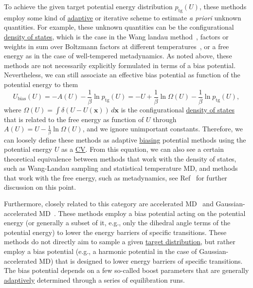 \documentclass[9pt,review]{livecoms}
\newcommand{\vx}{\mathbf{x}}
\begin{document}
To achieve the given target potential energy distribution $p_{\mathrm{tg}}(U)$, these methods employ some kind of \hyperlink{ref:Adaptive} {adaptive} or iterative scheme to estimate \textit{a priori} unknown quantities. For example, these unknown quantities can be the configurational \hyperlink{ref:density_of_states}{density of states}, which is the case in the Wang landau method~\cite{wang-landau:prl:2001:wang-landau,Kim2006_PRL_STMD,DePablo_DOS_2012}, factors or weights in sum over Boltzmann factors at different temperatures~\cite{Gao_ITS_2008,invernizzi2020unified}, or a free energy as in the case of well-tempered metadynamics. As noted above, these methods are not necessarily explicitly formulated in terms of a bias potential. Nevertheless, we can still associate an effective bias potential as function of the potential energy to them
\begin{equation}
U_\mathrm{bias}(U) = - A(U) -\frac{1}{\beta} \ln p_{\mathrm{tg}}(U) = - U + \frac{1}{\beta} \ln \Omega(U) -\frac{1}{\beta} \ln p_{\mathrm{tg}}(U),
\end{equation}
where $\Omega(U) = \int \delta(U-U(\vx)) \, d\vx$ is the configurational \hyperlink{ref:density_of_states}{density of states} that is related to the free energy as function of $U$ through $A(U)=U - \frac{1}{\beta} \ln \Omega(U)$, and we ignore unimportant constants. Therefore, we can loosely define these methods as adaptive \hyperlink{ref:biasingE} {biasing} potential methods using the potential energy $U$ as a \hyperlink{ref:CV} {CV}. From this equation, we can also see a certain theoretical equivalence between methods that work with the density of states, such as Wang-Landau sampling and statistical temperature MD, and methods that work with the free energy, such as metadynamics, see Ref~\cite{Junghans2014wte-wl} for further discussion on this point.

Furthermore, closely related to this category are accelerated MD~\cite{Hamelberg2004} and Gaussian-accelerated MD~\cite{Miao2017, Wang2021}. These methods employ a bias potential acting on the potential energy (or generally a subset of it, e.g., only the dihedral angle terms of the potential energy) to lower the energy barriers of specific transitions. These methods do not directly aim to sample a given \hyperlink{ref:targetdist} {target distribution}, but rather employ a bias potential (e.g., a harmonic potential in the case of Gaussian-accelerated MD) that is designed to lower energy barriers of specific transitions. The bias potential depends on a few so-called boost parameters that are generally \hyperlink{ref:Adaptive} {adaptively} determined through a series of equilibration runs. 
\end{document}
